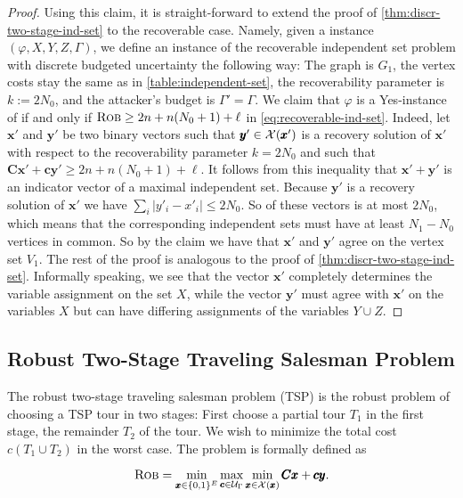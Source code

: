 \begin{proof}
Using this claim, it is straight-forward to extend the proof of \cref{thm:discr-two-stage-ind-set} to the recoverable case.
 Namely, given a {\radj} instance $(\varphi,X,Y,Z,\Gamma)$, we define an instance of the recoverable independent set problem with discrete budgeted uncertainty the following way: 
 The graph is $G_1$, the vertex costs stay the same as in \cref{table:independent-set}, the recoverability parameter is $k := 2N_0$, and the attacker's budget is $\Gamma' = \Gamma$. 
 We claim that $\varphi$ is a Yes-instance of {\radj} if and only if $\textsc{Rob} \geq 2n + n(N_0+1) + \ell$ in \cref{eq:recoverable-ind-set}.
Indeed, let $\pmb x'$ and $\pmb y'$ be two binary vectors such that $\pmb y' \in \mathcal{X}(\pmb x')$ is a recovery solution of $\pmb x'$ with respect to the recoverability parameter $k = 2N_0$ and such that $\pmb C \pmb x' + \pmb c \pmb y' \geq 2n + n(N_0+1) + \ell$. 
It follows from this inequality that $\pmb x' + \pmb y'$ is an indicator vector of a maximal independent set. 
Because $\pmb y'$ is a recovery solution of $\pmb x'$ we have $\sum_i |y'_i - x'_i| \leq 2N_0$. So  of these vectors is at most $2N_0$, which means that the corresponding independent sets must have at least $N_1 - N_0$ vertices in common.
So by the claim we have that $\pmb x'$ and $\pmb y'$ agree on the vertex set $V_1$. 
The rest of the proof is analogous to the proof of \cref{thm:discr-two-stage-ind-set}.
 Informally speaking, we see that the vector $\pmb x'$ completely determines the variable assignment on the set $X$, while the vector $\pmb y'$ must agree with $\pmb x'$ on the variables $X$ but can have differing assignments of the variables $Y \cup Z$.
\end{proof}

\subsection{Robust Two-Stage Traveling Salesman Problem}
\label{subsec:two-stage-tsp}

The robust two-stage traveling salesman problem (TSP) is the robust problem of choosing a TSP tour in two stages: 
First choose a partial tour $T_1$ in the first stage,  the remainder $T_2$ of the tour.
We wish to minimize the total cost $c(T_1 \cup T_2)$ in the worst case. 
The problem is formally defined as

\begin{equation*}
\textsc{Rob} = \min_{\pmb x \in \{ 0,1 \}^E} \max_{\pmb c \in \mathcal{U}_\Gamma } \min_{\pmb x \in \mathcal{X}(\pmb x)} \pmb C \pmb x + \pmb c \pmb y. 
\end{equation*} 

